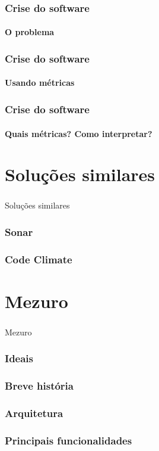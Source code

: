 \documentclass{beamer}
\begin{document}
\begin{frame}
  \frametitle{Crise do software}
  \framesubtitle{O problema}
\end{frame}

\begin{frame}
  \frametitle{Crise do software}
  \framesubtitle{Usando métricas}
\end{frame}

\begin{frame}
  \frametitle{Crise do software}
  \framesubtitle{Quais métricas? Como interpretar?}
\end{frame}

\section{Soluções similares}
\begin{frame}
  \frametitle{}
  \framesubtitle{}

  Soluções similares
\end{frame}

\begin{frame}
  \frametitle{Sonar}
  \framesubtitle{}
\end{frame}

\begin{frame}
  \frametitle{Code Climate}
  \framesubtitle{}
\end{frame}

\section{Mezuro}
\begin{frame}
  \frametitle{}
  \framesubtitle{}

  Mezuro
\end{frame}

\begin{frame}
  \frametitle{Ideais}
  \framesubtitle{}
\end{frame}

\begin{frame}
  \frametitle{Breve história}
  \framesubtitle{}
\end{frame}

\begin{frame}
  \frametitle{Arquitetura}
  \framesubtitle{}
\end{frame}

\begin{frame}
  \frametitle{Principais funcionalidades}
  \framesubtitle{}
\end{frame}
\end{document}
